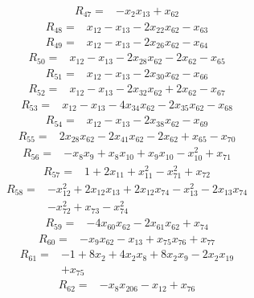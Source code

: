 \begin{align*} R_{47}={}&-x_{2}x_{13} +x_{62}
\end{align*}
\begin{align*} R_{48}={}&x_{12} -x_{13} -2 x_{22}x_{62} -x_{63}
\end{align*}
\begin{align*} R_{49}={}&x_{12} -x_{13} -2 x_{26}x_{62} -x_{64}
\end{align*}
\begin{align*} R_{50}={}&x_{12} -x_{13} -2 x_{28}x_{62} -2 x_{62} -x_{65}
\end{align*}
\begin{align*} R_{51}={}&x_{12} -x_{13} -2 x_{30}x_{62} -x_{66}
\end{align*}
\begin{align*} R_{52}={}&x_{12} -x_{13} -2 x_{32}x_{62} +2 x_{62} -x_{67}
\end{align*}
\begin{align*} R_{53}={}&x_{12} -x_{13} -4 x_{34}x_{62} -2 x_{35}x_{62} -x_{68}
\end{align*}
\begin{align*} R_{54}={}&x_{12} -x_{13} -2 x_{38}x_{62} -x_{69}
\end{align*}
\begin{align*} R_{55}={}&2 x_{28}x_{62} -2 x_{41}x_{62} -2 x_{62} +x_{65} -x_{70}
\end{align*}
\begin{align*} R_{56}={}&-x_{8}x_{9} +x_{8}x_{10} +x_{9}x_{10} -x_{10}^{2} +x_{71}
\end{align*}
\begin{align*} R_{57}={}&1 +2 x_{11} +x_{11}^{2} -x_{71}^{2} +x_{72}
\end{align*}
\begin{align*} R_{58}={}&-x_{12}^{2} +2 x_{12}x_{13} +2 x_{12}x_{74} -x_{13}^{2} -2 x_{13}x_{74}
\\ &-x_{72}^{2} +x_{73} -x_{74}^{2}
\end{align*}
\begin{align*} R_{59}={}&-4 x_{60}x_{62} -2 x_{61}x_{62} +x_{74}
\end{align*}
\begin{align*} R_{60}={}&-x_{9}x_{62} -x_{13} +x_{75}x_{76} +x_{77}
\end{align*}
\begin{align*} R_{61}={}&-1 +8 x_{2} +4 x_{2}x_{8} +8 x_{2}x_{9} -2 x_{2}x_{19}
\\ &+x_{75}
\end{align*}
\begin{align*} R_{62}={}&-x_{8}x_{206} -x_{12} +x_{76}
\end{align*}
